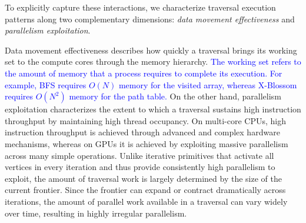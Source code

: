 To explicitly capture these interactions, we characterize traversal execution patterns along two complementary dimensions: \emph{data movement effectiveness} and \emph{parallelism exploitation}.


Data movement effectiveness describes how quickly a traversal brings its working set to the compute cores through the memory hierarchy. 
\textcolor{blue}{The working set refers to the amount of memory that a process requires to complete its execution. For example, BFS requires $O(N)$ memory for the visited array, whereas X-Blossom requires $O(N^2)$ memory for the path table.}
On the other hand, parallelism exploitation characterizes the extent to which a traversal sustains high instruction throughput by maintaining high thread occupancy. On multi-core CPUs, high instruction throughput is achieved through advanced and complex hardware mechanisms, whereas on GPUs it is achieved by exploiting massive parallelism across many simple operations.
Unlike iterative primitives that activate all vertices in every iteration and thus provide consistently high parallelism to exploit, the amount of traversal work is largely determined by the size of the current frontier.
Since the frontier can expand or contract dramatically across iterations, the amount of parallel work available in a traversal can vary widely over time, resulting in highly irregular parallelism.

